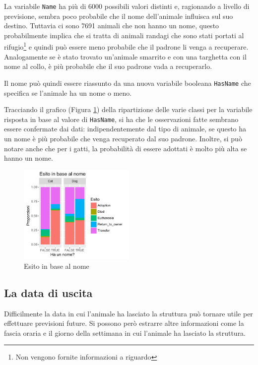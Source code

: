 La variabile \texttt{Name} ha più di 6000 possibili valori distinti e, ragionando a livello di previsione, sembra poco probabile che il nome dell'animale influisca sul suo destino. Tuttavia ci sono 7691 animali che non hanno un nome, questo probabilmente implica che si tratta di animali randagi che sono stati portati al rifugio\footnote{Non vengono fornite informazioni a riguardo} e quindi può essere meno probabile che il padrone li venga a recuperare. Analogamente se è stato trovato un'animale smarrito e con una targhetta con il nome al collo, è più probabile che il suo padrone vada a recuperarlo.

Il nome può quindi essere riassunto da una nuova variabile booleana \texttt{HasName} che specifica se l'animale ha un nome o meno.

Tracciando il grafico (Figura \ref{fig-has-name}) della ripartizione delle varie classi per la variabile risposta in base al valore di \texttt{HasName}, si ha che le osservazioni fatte sembrano essere confermate dai dati: indipendentemente dal tipo di animale, se questo ha un nome è più probabile che venga recuperato dal suo padrone. Inoltre, si può notare anche che per i gatti, la probabilità di essere adottati è molto più alta se hanno un nome.

\begin{figure}[htbp]
	\centering
	\includegraphics[width=0.5\textwidth]{./grafici/esito_has_name.pdf}
	\caption{Esito in base al nome}\label{fig-has-name}
\end{figure}

\subsection{La data di uscita}

Difficilmente la data in cui l'animale ha lasciato la struttura può tornare utile per effettuare previsioni future. Si possono però estrarre altre informazioni come la fascia oraria e il giorno della settimana in cui l'animale ha lasciato la struttura. 

